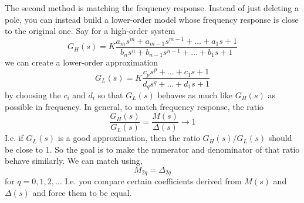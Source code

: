 The second method is matching the frequency response.
Instead of just deleting a pole, you can instead build a lower-order model whose frequency response is close to the original one.
Say for a high-order system
\begin{equation*}
  G_H (s) = K \frac{a_m s^{m} + a_{m-1} s^{m-1} + \ldots + a_1 s + 1}{b_n s^{n} + b_{n-1}s^{n-1}+\ldots +b_1s+1}
\end{equation*}
we can create a lower-order approximation
\begin{equation*}
G_L (s) = K \frac{c_p s^{p} + \ldots + c_1 s + 1}{d_q s^{q} + \ldots  + d_1s + 1}
\end{equation*}
by choosing the $c_i$ and $d_i$ so that $G_L(s)$ behaves as much like $G_H(s)$ as possible in frequency.
In general, to match frequency response, the ratio
\begin{equation*}
  \frac{G_H(s)}{G_L(s)} = \frac{M(s)}{\Delta (s)} \to 1
\end{equation*}
I.e. if $G_L(s)$ is a good approximation, then the ratio $G_H(s) / G_L(s)$ should be close to 1.
So the goal is to make the numerator and denominator of that ratio behave similarly.
We can match using,
\begin{equation*}
  M_{2q} = \Delta_{2q}
\end{equation*}
for $q = 0,1,2,\ldots $
I.e. you compare certain coefficients derived from $M(s)$ and $\Delta(s)$ and force them to be equal.

